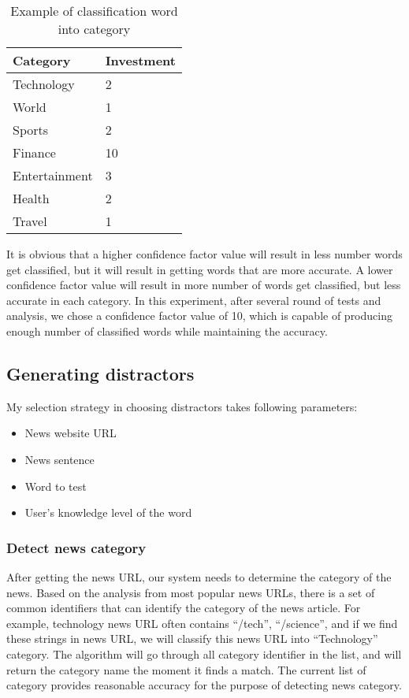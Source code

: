 \begin{table}[ht]
    \caption{Example of classification word into category}
    \begin{center}
    \begin{tabular}{| p{3.5cm} | p{3cm} |}
        \hline
        Category & Investment\\
        \hline
        Technology & 2 \\
        \hline
        World & 1 \\
        \hline
        Sports & 2 \\
        \hline
        Finance & 10 \\
        \hline
        Entertainment & 3 \\
        \hline
        Health & 2 \\
        \hline
        Travel & 1\\
        \hline
    \end{tabular}
    \end{center}
\end{table}

It is obvious that a higher confidence factor value will result in less number words get classified, but it will result in getting words that are more accurate. A lower confidence factor value will result in more number of words get classified, but less accurate in each category. In this experiment, after several round of tests and analysis, we chose a confidence factor value of 10, which is capable of producing enough number of classified words while maintaining the accuracy.
\subsection{Generating distractors}
My selection strategy in choosing distractors takes following parameters:
\begin{itemize}
\item News website URL
\item News sentence
\item Word to test
\item User’s knowledge level of the word
\end{itemize}
\subsubsection{Detect news category}
After getting the news URL, our system needs to determine the category of the news. Based on the analysis from most popular news URLs, there is a set of common identifiers that can identify the category of the news article. For example, technology news URL often contains “/tech”, “/science”, and if we find these strings in news URL, we will classify this news URL into “Technology” category. The algorithm will go through all category identifier in the list, and will return the category name the moment it finds a match. The current list of category provides reasonable accuracy for the purpose of detecting news category.

